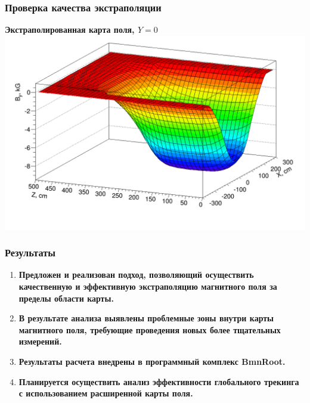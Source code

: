 \documentclass[svgnames] {beamer}
\begin{document}
\begin{frame}
  \frametitle{Проверка качества экстраполяции}
   \begin{block}{\centering \bf Экстраполированная карта поля, $Y = 0$}
      \centering \includegraphics[width=1.0\linewidth]{fieldMap_extrap_pic2.png}
    \end{block}
 \end{frame}

\begin{frame}
  \frametitle{Результаты}
  \begin{enumerate}
  \item \bf Предложен и реализован подход, позволяющий осуществить качественную и эффективную экстраполяцию магнитного поля за пределы области карты.
  \item \bf В результате анализа выявлены проблемные зоны внутри карты магнитного поля, требующие проведения новых более тщательных измерений. 
  \item \bf Результаты расчета внедрены в программный комплекс BmnRoot.
  \item \bf \color{red}Планируется осуществить анализ эффективности глобального трекинга с использованием расширенной карты поля.
  \end{enumerate}
 \end{frame}


\end{document}
